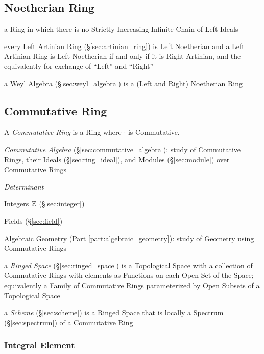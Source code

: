 \subsection{Noetherian Ring}\label{sec:noetherian_ring}

a Ring in which there is no Strictly Increasing Infinite Chain of Left Ideals

every Left Artinian Ring (\S\ref{sec:artinian_ring}) is Left Noetherian and a
Left Artinian Ring is Left Noetherian if and only if it is Right Artinian, and
the equivalently for exchange of ``Left'' and ``Right''

\fist a Weyl Algebra (\S\ref{sec:weyl_algebra}) is a (Left and Right)
Noetherian Ring



\subsection{Commutative Ring}\label{sec:commutative_ring}

A \emph{Commutative Ring} is a Ring where $\cdot$ is Commutative.

\fist \emph{Commutative Algebra} (\S\ref{sec:commutative_algebra}): study of
Commutative Rings, their Ideals (\S\ref{sec:ring_ideal}), and Modules
(\S\ref{sec:module}) over Commutative Rings

\emph{Determinant}

Integers $\mathbb{Z}$ (\S\ref{sec:integer})

Fields (\S\ref{sec:field})

Algebraic Geometry (Part \ref{part:algebraic_geometry}): study of
Geometry using Commutative Rings

\fist a \emph{Ringed Space} (\S\ref{sec:ringed_space}) is a Topological Space
with a collection of Commutative Rings with elements as Functions on each Open
Set of the Space; equivalently a Family of Commutative Rings parameterized by
Open Subsets of a Topological Space

\fist a \emph{Scheme} (\S\ref{sec:scheme}) is a Ringed Space that is locally a
Spectrum (\S\ref{sec:spectrum}) of a Commutative Ring



\subsubsection{Integral Element}\label{sec:integral_element}

